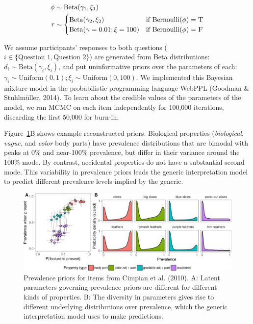 \documentclass[floatsintext,man]{apa6}
\theoremstyle{definition}
\theoremstyle{definition}
\theoremstyle{definition}
\theoremstyle{remark}
\begin{document}
\begin{align}
\phi & \sim \text{Beta}(\gamma_1, \xi_1) \nonumber \\ 
r & \sim \begin{cases}
        \text{Beta}(\gamma_2, \xi_2) &\mbox{if } \text{Bernoulli}(\phi) = \textsc{T} \label{eq:priorModel}  \\
        \text{Beta}(\gamma = 0.01; \xi = 100) &\mbox{if } \text{Bernoulli}(\phi) = \textsc{F} \\
        \end{cases}
\end{align}

We assume participants' responses to both questions
(\(i \in \{\text{Question 1}, \text{Question 2}\}\)) are generated from
Beta distributions: \(d_{i} \sim \text{Beta}(\gamma_i, \xi_i)\), and put
uninformative priors over the parameters of each:
\(\gamma_i \sim \text{Uniform}(0, 1); \xi_i \sim \text{Uniform}(0, 100)\).
We implemented this Bayesian mixture-model in the probabilistic
programming language WebPPL (Goodman \& Stuhlmüller, 2014). To learn
about the credible values of the parameters of the model, we ran MCMC on
each item independently for 100,000 iterations, discarding the first
50,000 for burn-in.

Figure~\ref{fig:cimpian-prevPrior}B shows example reconstructed priors.
Biological properties (\emph{biological}, \emph{vague}, and \emph{color}
body parts) have prevalence distributions that are bimodal with peaks at
0\% and near-100\% prevalence, but differ in their variance around the
100\%-mode. By contrast, accidental properties do not have a substantial
second mode. This variability in prevalence priors leads the generic
interpretation model to predict different prevalence levels implied by
the generic.

\begin{figure}
\centering
\includegraphics{genint_files/figure-latex/cimpian-prevPrior-1.pdf}
\caption{\label{fig:cimpian-prevPrior}Prevalence priors for items from
Cimpian et al. (2010). A: Latent parameters governing prevalence priors
are different for different kinds of properties. B: The diversity in
parameters gives rise to different underlying distributions over
prevalence, which the generic interpretation model uses to make
predictions.}
\end{figure}
\end{document}
